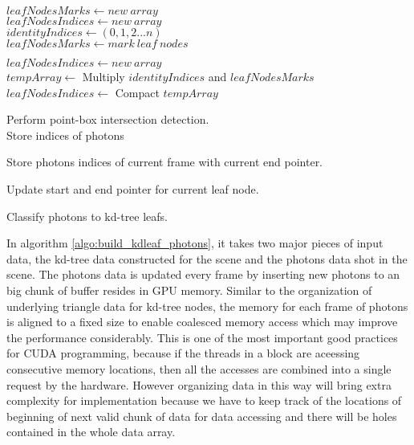 \begin{algorithm}[H]
	\SetAlgoLined

	\( leafNodesMarks \leftarrow new\ array  \) \\
	\( leafNodesIndices \leftarrow new\ array  \) \\
	\( identityIndices \leftarrow (0, 1, 2 ... n) \) \\ 

	 {
		\( leafNodesMarks \leftarrow mark\ leaf\ nodes  \) \\
	}

	\( leafNodesIndices \leftarrow new\ array  \) \\
	\(tempArray \leftarrow \) Multiply \(identityIndices\) and \(leafNodesMarks\)
	\( leafNodesIndices \leftarrow \) Compact \( tempArray \)
	 
	 {
		 {
			Perform point-box intersection detection. \\ 
			Store indices of photons 
		}
	}
	
	 {
		 {
			Store photons indices of current frame with current end pointer. 
		}

		Update start and end pointer for current leaf node.
	}
	
	\caption{Classify photons to kd-tree leafs. } 	
	\label{algo:build_kdleaf_photons} 
\end{algorithm}

 \vspace{20pt}

In algorithm \ref{algo:build_kdleaf_photons}, it takes two major pieces of input data, the kd-tree data constructed for the scene and the photons data shot in the scene. The photons data is updated every frame by inserting new photons to an big chunk of buffer resides in GPU memory. Similar to the organization of underlying triangle data for kd-tree nodes, the memory for each frame of photons is aligned to a fixed size to enable coalesced memory access which may improve the performance considerably. This is one of the most important good practices for CUDA programming, because if the threads in a block are aceessing consecutive memory locations, then all the accesses are combined into a single request by the hardware. However organizing data in this way will bring extra complexity for implementation because we have to keep track of the locations of beginning of next valid chunk of data for data accessing and there will be holes contained in the whole data array. 

